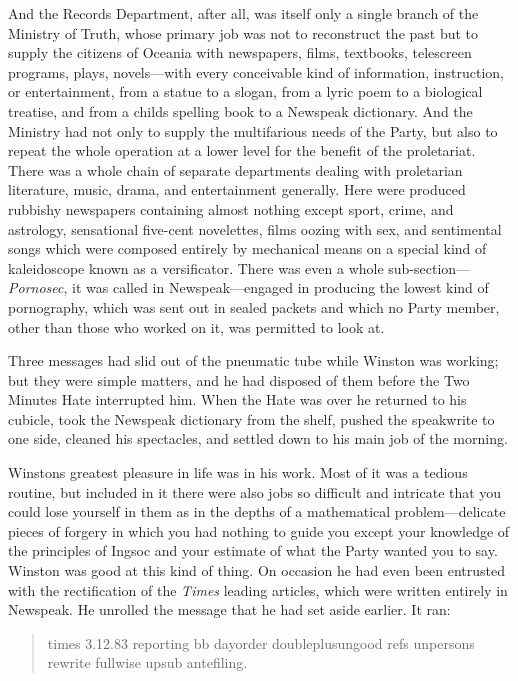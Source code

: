 And the Records Department, after all, was itself only a single branch
of the Ministry of Truth, whose primary job was not to reconstruct the
past but to supply the citizens of Oceania with newspapers, films,
textbooks, telescreen programs, plays, novels---with every conceivable
kind of information, instruction, or entertainment, from a statue to a
slogan, from a lyric poem to a biological treatise, and from a
child\textquotesingle s spelling book to a Newspeak dictionary. And the
Ministry had not only to supply the multifarious needs of the Party, but
also to repeat the whole operation at a lower level for the benefit of
the proletariat. There was a whole chain of separate departments dealing
with proletarian literature, music, drama, and entertainment generally.
Here were produced rubbishy newspapers containing almost nothing except
sport, crime, and astrology, sensational five-cent novelettes, films
oozing with sex, and sentimental songs which were composed entirely by
mechanical means on a special kind of kaleidoscope known as a
versificator. There was even a whole sub-section---\emph{Pornosec}, it
was called in Newspeak---engaged in producing the lowest kind of
pornography, which was sent out in sealed packets and which no Party
member, other than those who worked on it, was permitted to look at.

Three messages had slid out of the pneumatic tube while Winston was
working; but they were simple matters, and he had disposed of them
before the Two Minutes Hate interrupted him. When the Hate was over he
returned to his cubicle, took the Newspeak dictionary from the shelf,
pushed the speakwrite to one side, cleaned his spectacles, and settled
down to his main job of the morning.

Winston\textquotesingle s greatest pleasure in life was in his work.
Most of it was a tedious routine, but included in it there were also
jobs so difficult and intricate that you could lose yourself in them as
in the depths of a mathematical problem---delicate pieces of forgery in
which you had nothing to guide you except your knowledge of the
principles of Ingsoc and your estimate of what the Party wanted you to
say. Winston was good at this kind of thing. On occasion he had even
been entrusted with the rectification of the \emph{Times} leading
articles, which were written entirely in Newspeak. He unrolled the
message that he had set aside earlier. It ran:

\begin{quotation}
times 3.12.83 reporting bb dayorder doubleplusungood refs unpersons
rewrite fullwise upsub antefiling.
\end{quotation}

